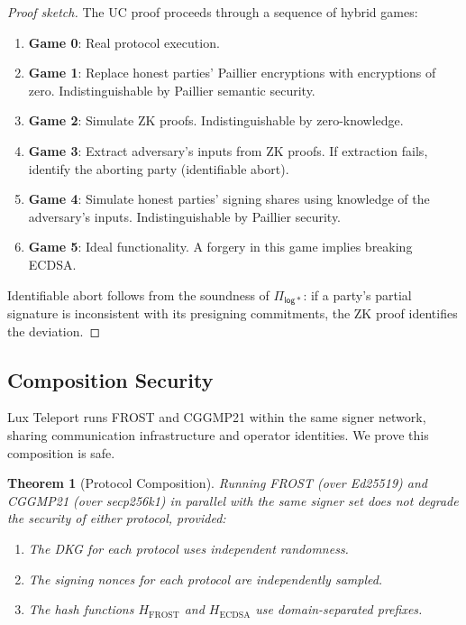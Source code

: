 \documentclass[11pt,twocolumn]{article}
\newtheorem{theorem}{Theorem}[section]
\begin{document}
\begin{proof}[Proof sketch]
The UC proof proceeds through a sequence of hybrid games:

\begin{enumerate}[nosep]
  \item \textbf{Game 0}: Real protocol execution.
  \item \textbf{Game 1}: Replace honest parties' Paillier encryptions with
    encryptions of zero. Indistinguishable by Paillier semantic security.
  \item \textbf{Game 2}: Simulate ZK proofs. Indistinguishable by zero-knowledge.
  \item \textbf{Game 3}: Extract adversary's inputs from ZK proofs. If extraction
    fails, identify the aborting party (identifiable abort).
  \item \textbf{Game 4}: Simulate honest parties' signing shares using knowledge of
    the adversary's inputs. Indistinguishable by Paillier security.
  \item \textbf{Game 5}: Ideal functionality. A forgery in this game implies breaking
    ECDSA.
\end{enumerate}

Identifiable abort follows from the soundness of $\Pi_{\mathsf{log*}}$: if a party's
partial signature is inconsistent with its presigning commitments, the ZK proof
identifies the deviation.
\end{proof}

\subsection{Composition Security}

Lux Teleport runs FROST and CGGMP21 within the same signer network, sharing
communication infrastructure and operator identities. We prove this composition is
safe.

\begin{theorem}[Protocol Composition]
\label{thm:composition}
Running FROST (over Ed25519) and CGGMP21 (over secp256k1) in parallel with the same
signer set does not degrade the security of either protocol, provided:
\begin{enumerate}[nosep]
  \item The DKG for each protocol uses independent randomness.
  \item The signing nonces for each protocol are independently sampled.
  \item The hash functions $H_{\text{FROST}}$ and $H_{\text{ECDSA}}$ use
    domain-separated prefixes.
\end{enumerate}
\end{theorem}
\end{document}
